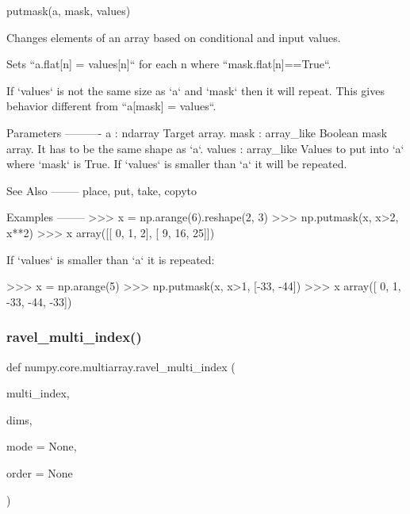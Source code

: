 \begin{DoxyVerb}putmask(a, mask, values)

Changes elements of an array based on conditional and input values.

Sets ``a.flat[n] = values[n]`` for each n where ``mask.flat[n]==True``.

If `values` is not the same size as `a` and `mask` then it will repeat.
This gives behavior different from ``a[mask] = values``.

Parameters
----------
a : ndarray
    Target array.
mask : array_like
    Boolean mask array. It has to be the same shape as `a`.
values : array_like
    Values to put into `a` where `mask` is True. If `values` is smaller
    than `a` it will be repeated.

See Also
--------
place, put, take, copyto

Examples
--------
>>> x = np.arange(6).reshape(2, 3)
>>> np.putmask(x, x>2, x**2)
>>> x
array([[ 0,  1,  2],
       [ 9, 16, 25]])

If `values` is smaller than `a` it is repeated:

>>> x = np.arange(5)
>>> np.putmask(x, x>1, [-33, -44])
>>> x
array([  0,   1, -33, -44, -33])\end{DoxyVerb}
 \mbox{\label{namespacenumpy_1_1core_1_1multiarray_a71190a48e8a753b72e80bed3b822613d}} 
\subsubsection{\texorpdfstring{ravel\+\_\+multi\+\_\+index()}{ravel\_multi\_index()}}
{\footnotesize\ttfamily def numpy.\+core.\+multiarray.\+ravel\+\_\+multi\+\_\+index (\begin{DoxyParamCaption}\item[{}]{multi\+\_\+index,  }\item[{}]{dims,  }\item[{}]{mode = {\ttfamily None},  }\item[{}]{order = {\ttfamily None} }\end{DoxyParamCaption})}

